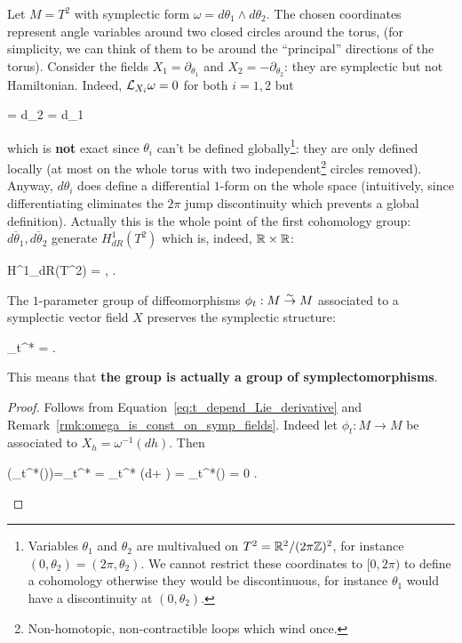 \documentclass[main.tex]{subfiles}
\begin{document}
\begin{example}
	Let $M = T^2$ with symplectic form $\omega = d\theta_1 \wedge d\theta_2$. The chosen coordinates represent angle variables around two closed circles around the torus, (for simplicity, we can think of them to be around the ``principal'' directions of the torus). Consider the fields $X_1 = \partial_{\theta_1}$ and $X_2 = -\partial_{\theta_2}$: they are symplectic but not Hamiltonian. Indeed, $\mathcal{L}_{X_i} \omega = 0$ for both $i=1,2$ but
	\begin{eqalign}
		 \omega = d\theta_{2}
		\qquad {} \qquad
		 \omega = d\theta_{1}
	\end{eqalign}
	which is \textbf{not} exact since $\theta_i$ can't be defined globally\footnote{Variables $\theta_1$ and $\theta_2$ are multivalued on $T^2 = \mathbb{R}^2/(2\pi\mathbb{Z})^2$, for instance $(0,\theta_2) = (2\pi, \theta_2)$. We cannot restrict these coordinates to $[0, 2\pi)$ to define a cohomology otherwise they would be discontinuous, for instance $\theta_1$ would have a discontinuity at $(0, \theta_2)$.}: they are only defined locally (at most on the whole torus with two independent\footnote{Non-homotopic, non-contractible loops which wind once.} circles removed). Anyway, $d\theta_i$ does define a differential $1$-form on the whole space (intuitively, since differentiating eliminates the $2\pi$ jump discontinuity which prevents a global definition). Actually this is the whole point of the first cohomology group: $\overline{d\theta_1}, \overline{d\theta_2}$ generate $H^1_{dR}(T^2)$ which is, indeed, $\mathbb{R} \times \mathbb{R}$:
	\begin{eqalign}
		H^1_{dR}(T^2) = \langle {},  \rangle \iso \R \times \R .
	\end{eqalign}
\end{example}

\begin{theorem}
\label{th:flow_of_symp_field}
	The $1$-parameter group of diffeomorphisms $\phi_t : M \overset{\sim}\to M$ associated to a symplectic vector field $X$ preserves the symplectic structure:
	\begin{eqalign}
	\label{eq:ham_flow_sympl}
		\phi_t^* \omega = \omega.
	\end{eqalign}
	This means that \textbf{the group is actually a group of symplectomorphisms}.
\end{theorem}
\begin{proof}
	Follows from Equation~\ref{eq:t_depend_Lie_derivative} and Remark~\ref{rmk:omega_is_const_on_symp_fields}. Indeed let $\phi_t : M \to M$ be associated to $X_h = \omega^{-1}(dh)$. Then 
	\begin{eqalign}
		(\phi_t^*(\omega))=\phi_t^* \omega = \phi_t^* (d\omega + ) = \phi_t^*() = 0 .
	\end{eqalign}
\end{proof}
\end{document}

